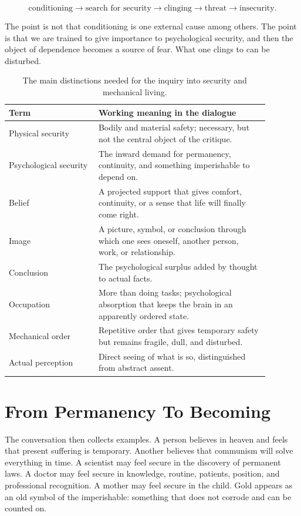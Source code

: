 \begin{equation}
\text{conditioning}
\longrightarrow
\text{search for security}
\longrightarrow
\text{clinging}
\longrightarrow
\text{threat}
\longrightarrow
\text{insecurity}.
\end{equation}

The point is not that conditioning is one external cause among others. The point is that we are trained to give importance to psychological security, and then the object of dependence becomes a source of fear. What one clings to can be disturbed.

\begin{table}
\centering
\begin{tabular}{|p{0.30\linewidth}|p{0.58\linewidth}|}
\hline
\textbf{Term} & \textbf{Working meaning in the dialogue} \\
\hline
Physical security & Bodily and material safety; necessary, but not the central object of the critique. \\
\hline
Psychological security & The inward demand for permanency, continuity, and something imperishable to depend on. \\
\hline
Belief & A projected support that gives comfort, continuity, or a sense that life will finally come right. \\
\hline
Image & A picture, symbol, or conclusion through which one sees oneself, another person, work, or relationship. \\
\hline
Conclusion & The psychological surplus added by thought to actual facts. \\
\hline
Occupation & More than doing tasks; psychological absorption that keeps the brain in an apparently ordered state. \\
\hline
Mechanical order & Repetitive order that gives temporary safety but remains fragile, dull, and disturbed. \\
\hline
Actual perception & Direct seeing of what is so, distinguished from abstract assent. \\
\hline
\end{tabular}
\caption{The main distinctions needed for the inquiry into security and mechanical living.}
\end{table}

\section{From Permanency To Becoming}

The conversation then collects examples. A person believes in heaven and feels that present suffering is temporary. Another believes that communism will solve everything in time. A scientist may feel secure in the discovery of permanent laws. A doctor may feel secure in knowledge, routine, patients, position, and professional recognition. A mother may feel secure in the child. Gold appears as an old symbol of the imperishable: something that does not corrode and can be counted on.

